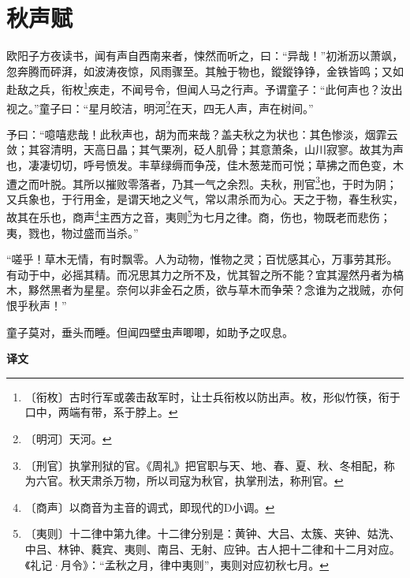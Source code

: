 \documentclass[12pt,UTF-8,openany,a4]{ctexbook}
\begin{document}
\chapter{秋声赋}

\begin{large}
    
    欧阳子方夜读书，闻有声自西南来者，悚然而听之，曰：“异哉！”初淅沥以萧飒，忽奔腾而砰湃，如波涛夜惊，风雨骤至。其触于物也，鏦鏦铮铮，金铁皆鸣；又如赴敌之兵，衔枚\footnote{〔衔枚〕\yiwen 古时行军或袭击敌军时，让士兵衔枚以防出声。枚，形似竹筷，衔于口中，两端有带，系于脖上。}疾走，不闻号令，但闻人马之行声。予谓童子：“此何声也？汝出视之。”童子曰：“星月皎洁，明河\footnote{〔明河〕\yiwen 天河。}在天，四无人声，声在树间。”
    
    予曰：“噫嘻悲哉！此秋声也，胡为而来哉？盖夫秋之为状也：其色惨淡，烟霏云敛；其容清明，天高日晶；其气栗冽，砭人肌骨；其意萧条，山川寂寥。故其为声也，凄凄切切，呼号愤发。丰草绿缛而争茂，佳木葱茏而可悦；草拂之而色变，木遭之而叶脱。其所以摧败零落者，乃其一气之余烈。夫秋，刑官\footnote{〔刑官〕\yiwen 执掌刑狱的官。《周礼》把官职与天、地、春、夏、秋、冬相配，称为六官。秋天肃杀万物，所以司寇为秋官，执掌刑法，称刑官。}也，于时为阴；又兵象也，于行用金，是谓天地之义气，常以肃杀而为心。天之于物，春生秋实，故其在乐也，商声\footnote{〔商声〕\yiwen 以商音为主音的调式，即现代的D小调。}主西方之音，夷则\footnote{〔夷则〕\yiwen 十二律中第九律。十二律分别是：黄钟、大吕、太簇、夹钟、姑洗、中吕、林钟、蕤宾、夷则、南吕、无射、应钟。古人把十二律和十二月对应。《礼记·月令》：“孟秋之月，律中夷则”，夷则对应初秋七月。}为七月之律。商，伤也，物既老而悲伤；夷，戮也，物过盛而当杀。”
    
    “嗟乎！草木无情，有时飘零。人为动物，惟物之灵；百忧感其心，万事劳其形。有动于中，必摇其精。而况思其力之所不及，忧其智之所不能？宜其渥然丹者为槁木，黟然黑者为星星。奈何以非金石之质，欲与草木而争荣？念谁为之戕贼，亦何恨乎秋声！”
    
    童子莫对，垂头而睡。但闻四壁虫声唧唧，如助予之叹息。
\end{large}


\newpage

\begin{Large}
    \noindent\textbf{译文}
\end{Large}


\vspace{1em}
\end{document}
